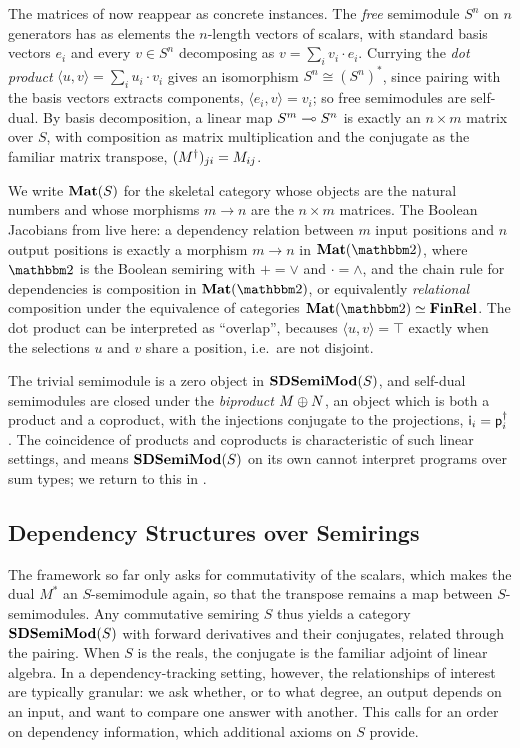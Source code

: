 The matrices of  now reappear as concrete instances. The \emph{free} semimodule $S^n$ on
$n$ generators has as elements the $n$-length vectors of scalars, with standard basis vectors $e_i$ and every
$v \in S^n$ decomposing as $v = \sum_i v_i \cdot e_i$. Currying the \emph{dot product} $\langle u, v \rangle =
\sum_i u_i \cdot v_i$ gives an isomorphism $S^n \cong (S^n)^*$, since pairing with the basis vectors extracts
components, $\langle e_i, v \rangle = v_i$; so free semimodules are self-dual. By basis decomposition, a
linear map $S^m \multimap S^n$ is exactly an $n \times m$ matrix over $S$, with composition as matrix
multiplication and the conjugate as the familiar matrix transpose, $(M^{\dagger})_{ji} = M_{ij}$.

We write $\mathbf{Mat}(S)$ for the skeletal category whose objects are the natural numbers and whose morphisms $m \to
n$ are the $n \times m$ matrices. The Boolean Jacobians from  live here: a dependency
relation between $m$ input positions and $n$ output positions is exactly a morphism $m \to n$ in $\Mat(\Two)$,
where $\Two$ is the Boolean semiring with $+ = \vee$ and $\cdot = \wedge$, and the chain rule for dependencies
is composition in $\Mat(\Two)$, or equivalently \emph{relational} composition under the equivalence of
categories $\Mat(\Two) \simeq \FinRel$. The dot product can be interpreted as ``overlap'', becauses $\langle
u, v \rangle = \top$ exactly when the selections $u$ and $v$ share a position, i.e.\ are not disjoint.

The trivial semimodule is a zero object in $\mathbf{SDSemiMod}(S)$, and self-dual semimodules are closed under the
\emph{biproduct} $M \oplus N$, an object which is both a product and a coproduct, with the injections
conjugate to the projections, $\mathsf{i}_i = \mathsf{p}_i^{\dagger}$. The coincidence of products and coproducts is
characteristic of such linear settings, and means $\mathbf{SDSemiMod}(S)$ on its own cannot interpret programs over
sum types; we return to this in .

\subsection{Dependency Structures over Semirings}
\label{sec:approx-as-tangents:richer-semirings}

The framework so far only asks for commutativity of the scalars, which makes the dual $M^*$ an $S$-semimodule
again, so that the transpose remains a map between $S$-semimodules. Any commutative semiring $S$ thus yields a
category $\mathbf{SDSemiMod}(S)$ with forward derivatives and their conjugates, related through the pairing. When $S$
is the reals, the conjugate is the familiar adjoint of linear algebra. In a dependency-tracking setting,
however, the relationships of interest are typically granular: we ask whether, or to what degree, an output
depends on an input, and want to compare one answer with another. This calls for an order on dependency
information, which additional axioms on $S$ provide.

